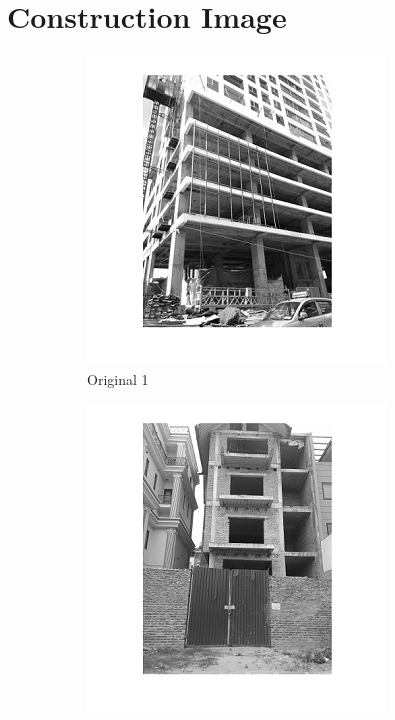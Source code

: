 \section*{Construction Image}
\begin{center}
\begin{figure}[h]
        \begin{subfigure}[b]{0.18\textwidth}
                \includegraphics[width=\linewidth]{construction-1.png}
                \caption{Original 1}
                \label{fig:original 1}
        \end{subfigure}%
        \begin{subfigure}[b]{0.18\textwidth}
                \includegraphics[width=\linewidth]{construction2.png}

\end{subfigure}
\end{figure}
\end{center}
